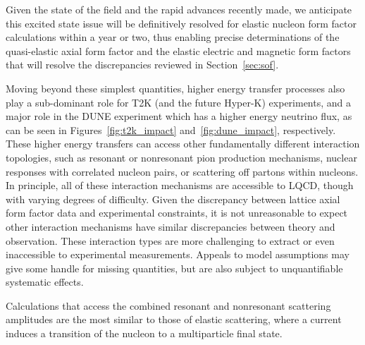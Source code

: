 Given the state of the field and the rapid advances recently made, we anticipate this excited state issue will be definitively resolved for elastic nucleon form factor calculations within a year or two, thus enabling precise determinations of the quasi-elastic axial form factor and the elastic electric and magnetic form factors that will resolve the discrepancies reviewed in Section~\ref{sec:sof}.


Moving beyond these simplest quantities, higher energy transfer processes also play a sub-dominant role for T2K (and the future
Hyper-K) experiments, and a major role in the DUNE experiment which has a higher energy neutrino
flux, as can be seen in Figures~\ref{fig:t2k_impact} and~\ref{fig:dune_impact}, respectively.
These higher energy transfers can access other fundamentally different interaction topologies,
 such as resonant or nonresonant pion production mechanisms,
 nuclear responses with correlated nucleon pairs,
 or scattering off partons within nucleons.
In principle, all of these interaction mechanisms are accessible to LQCD,
 though with varying degrees of difficulty.
Given the discrepancy between lattice axial form factor data and experimental constraints,
 it is not unreasonable to expect other interaction mechanisms have similar discrepancies
 between theory and observation.
These interaction types are more challenging to extract or even inaccessible to
 experimental measurements.
Appeals to model assumptions may give some handle for missing quantities,
 but are also subject to unquantifiable systematic effects.

Calculations that access the combined resonant and nonresonant scattering amplitudes
 are the most similar to those of elastic scattering,
 where a current induces a transition of the nucleon to a multiparticle final state.

